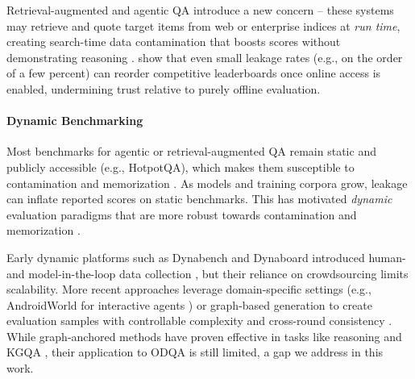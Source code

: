 Retrieval-augmented and agentic QA introduce a new concern -- these systems may retrieve and quote target items from web or enterprise indices at \emph{run time}, creating search-time data contamination that boosts scores without demonstrating reasoning \cite{hanSearchTimeDataContamination2025}. \citet{hanSearchTimeDataContamination2025} show that even small leakage rates (e.g., on the order of a few percent) can reorder competitive leaderboards once online access is enabled, undermining trust relative to purely offline evaluation. 


\paragraph{\textbf{Dynamic Benchmarking}}

Most benchmarks for agentic or retrieval-augmented QA remain static and publicly accessible (e.g., HotpotQA), which makes them susceptible to contamination and memorization \cite{yangHotpotQADatasetDiverse2018a,liOpenSourceData2024,ravautComprehensiveSurveyContamination2025a,carliniQuantifyingMemorizationNeural2023,morrisHowMuchLanguage2025}. As models and training corpora grow, leakage can inflate reported scores on static benchmarks. This has motivated \emph{dynamic} evaluation paradigms that are more robust towards contamination and memorization \cite{rawlesAndroidWorldDynamicBenchmarking2025,zhuDyVal2Dynamic2024,dammuDynamicKGQAScalableFramework2025a,zhangDARGDynamicEvaluation2024}. 

Early dynamic platforms such as Dynabench and Dynaboard introduced human- and model-in-the-loop data collection \cite{kielaDynabenchRethinkingBenchmarking2021a,maDynaboardEvaluationAsAServicePlatform2021,thrushDynataskFrameworkCreating2022}, but their reliance on crowdsourcing limits scalability. More recent approaches leverage domain-specific settings (e.g., AndroidWorld for interactive agents \cite{rawlesAndroidWorldDynamicBenchmarking2025}) or graph-based generation to create evaluation samples with controllable complexity and cross-round consistency \cite{zhuDyVal2Dynamic2024,dammuDynamicKGQAScalableFramework2025a,zhangDARGDynamicEvaluation2024}. While graph-anchored methods have proven effective in tasks like reasoning and KGQA \cite{dammuDynamicKGQAScalableFramework2025a,zhangDARGDynamicEvaluation2024}, their application to ODQA is still limited, a gap we address in this work.



